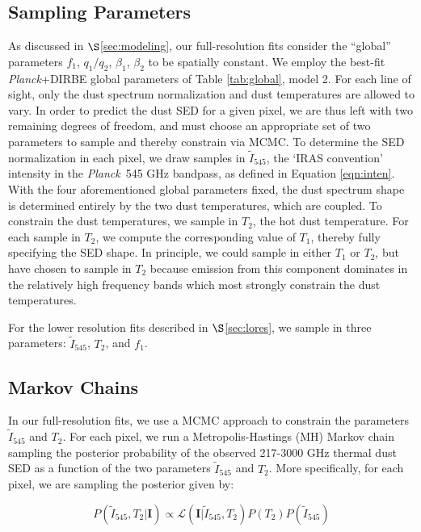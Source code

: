 \documentclass{emulateapj}
\newcommand{\PLANCK}{{\it Planck}}
\begin{document}
\subsection{Sampling Parameters}
\label{sec:samp}
As discussed in $\S$\ref{sec:modeling}, our full-resolution fits
consider the ``global'' parameters $f_1$, $q_1/q_2$, $\beta_1$, $\beta_2$ to be
spatially constant. We employ the best-fit \PLANCK+DIRBE global parameters of 
Table \ref{tab:global}, model 2. For each line of sight, only the dust spectrum
normalization and dust temperatures are allowed to vary. In order to predict 
the dust SED for a given pixel, we are thus left with two remaining degrees of 
freedom, and must choose an appropriate set of two parameters to sample and 
thereby constrain via MCMC. To determine the SED normalization in each pixel, 
we draw samples in $\tilde{I}_{545}$, the `IRAS convention' intensity in the 
\PLANCK~545 GHz bandpass, as defined in Equation \ref{eqn:inten}. With the four
aforementioned global parameters fixed, the dust spectrum shape is determined 
entirely by the two dust temperatures, which are coupled. To constrain the dust
temperatures, we sample in $T_2$, the hot dust temperature. For each sample in 
$T_2$, we compute the corresponding value of $T_1$, thereby fully specifying 
the SED shape. In principle, we could sample in either $T_1$ or $T_2$, but have
chosen to sample in $T_2$ because emission from this component dominates in the
relatively high frequency bands which most strongly constrain the dust 
temperatures.

For the lower resolution fits described in $\S$\ref{sec:lores}, we sample
in three parameters: $\tilde{I}_{545}$, $T_2$, and $f_1$.

\subsection{Markov Chains}
\label{sec:mcmc}

In our full-resolution fits, we use a MCMC approach to constrain the 
parameters $\tilde{I}_{545}$ and $T_2$. For each pixel, we run a 
Metropolis-Hastings (MH) Markov chain sampling the posterior probability of
the observed 217-3000 GHz thermal dust SED as a function of the two parameters 
$\tilde{I}_{545}$ and $T_2$. More specifically, for each pixel, we are sampling
the posterior given by:

\begin{equation}
\label{eqn:post}
P(\tilde{I}_{545}, T_2|\mathbf{I}) \propto \mathcal{L}(\mathbf{I}|\tilde{I}_{545}, T_2)P(T_2)P(\tilde{I}_{545})
\end{equation}
\end{document}
